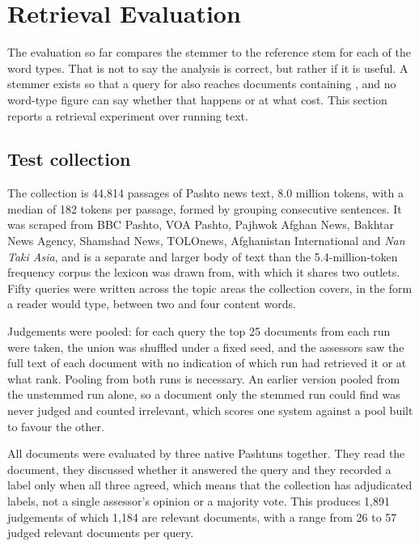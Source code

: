 \documentclass[conference]{IEEEtran}
\newcommand{\ps}[1]{{\pashtofont\textpashto{#1}}}
\begin{document}
\section{Retrieval Evaluation}
\label{sec:ir}

The evaluation so far compares the stemmer to the reference stem for each of the
word types. That is not to say the analysis is correct, but rather if it is
useful. A
stemmer exists so that a query for \ps{کور} also reaches documents containing
\ps{کورونه}, and no word-type figure can say whether that happens or at what
cost. This section reports a retrieval experiment over running text.

\subsection{Test collection}

The collection is 44{,}814 passages of Pashto news text, 8.0 million tokens, with
a median of 182 tokens per passage, formed by grouping consecutive sentences. It
was scraped from BBC Pashto, VOA Pashto, Pajhwok Afghan News, Bakhtar News
Agency, Shamshad News, TOLOnews, Afghanistan International and
\emph{Nan Taki Asia}, and
is a separate and larger body of text than the 5.4-million-token frequency
corpus the lexicon was drawn from, with which it shares two outlets. Fifty queries were written across the topic
areas the collection covers, in the form a reader would type, between two and
four content words.

Judgements were pooled: for each query the top 25 documents from each run were
taken, the union was shuffled under a fixed seed, and the assessors saw the full
text of each document with no indication of which run had retrieved it or at
what rank. Pooling from both runs is necessary. An earlier version pooled from
the unstemmed run alone, so a document only the stemmed run could find was never
judged and counted irrelevant, which scores one system against a pool built to
favour the other.

All documents were evaluated by three native Pashtuns together. They read the
document, they discussed whether it answered the query and they recorded a label
only when all three agreed, which means that the collection has adjudicated
labels, not a single assessor's opinion or a majority vote. This produces
1{,}891 judgements of which 1{,}184 are relevant documents, with a range from 26
to 57 judged relevant documents per query.
\end{document}
